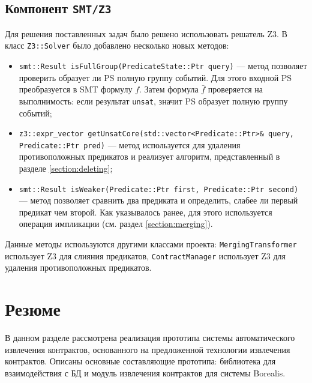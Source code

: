 \subsection{Компонент \texttt{SMT/Z3}}
Для решения поставленных задач было решено использовать решатель Z3. В класс \texttt{Z3::Solver} было добавлено несколько новых методов:
\begin{itemize}
\item \texttt{smt::Result isFullGroup(PredicateState::Ptr query)} --- метод позволяет проверить образует ли PS полную группу событий. Для этого входной PS преобразуется в SMT формулу $f$. Затем формула $\bar{f}$ проверяется на выполнимость: если результат \texttt{unsat}, значит PS образует полную группу событий;
\item \texttt{z3::expr_vector getUnsatCore(std::vector<Predicate::Ptr>\& query, Predicate::Ptr pred)} --- метод используется для удаления противоположных предикатов и реализует алгоритм, представленный в разделе \ref{section:deleting};
\item \texttt{smt::Result isWeaker(Predicate::Ptr first, Predicate::Ptr second)} --- метод позволяет сравнить два предиката и определить, слабее ли первый предикат чем второй. Как указывалось ранее, для этого используется операция импликации (см. раздел \ref{section:merging}).
\end{itemize}

Данные методы используются другими классами проекта: \texttt{MergingTransformer} использует Z3 для слияния предикатов, \texttt{ContractManager} использует Z3 для удаления противоположных предикатов.

\section{Резюме}
В данном разделе рассмотрена реализация прототипа системы автоматического извлечения контрактов, основанного на предложенной технологии извлечения контрактов. Описаны основные составляющие прототипа: библиотека для взаимодействия с БД и модуль извлечения контрактов для системы Borealis. 
